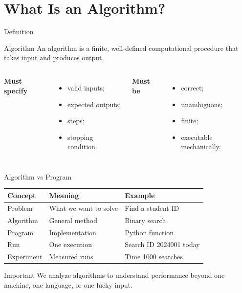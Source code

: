 \documentclass[aspectratio=169,xcolor=dvipsnames]{beamer}
\begin{document}
\section{What Is an Algorithm?}

\begin{frame}{Definition}
  \begin{block}{Algorithm}
    An algorithm is a finite, well-defined computational procedure that takes input and produces output.
  \end{block}
  \vspace{0.5em}
  \begin{columns}
    \textbf{Must specify}
    \begin{itemize}
      \item valid inputs;
      \item expected outputs;
      \item steps;
      \item stopping condition.
    \end{itemize}
    \textbf{Must be}
    \begin{itemize}
      \item correct;
      \item unambiguous;
      \item finite;
      \item executable mechanically.
    \end{itemize}
  \end{columns}
\end{frame}

\begin{frame}{Algorithm vs Program}
  \begin{table}
    \centering
    \begin{tabular}{lll}
      \toprule
      Concept & Meaning & Example \\
      \midrule
      Problem & What we want to solve & Find a student ID \\
      Algorithm & General method & Binary search \\
      Program & Implementation & Python function \\
      Run & One execution & Search ID 2024001 today \\
      Experiment & Measured runs & Time 1000 searches \\
      \bottomrule
    \end{tabular}
  \end{table}
  \vspace{0.5em}
  \begin{block}{Important}
    We analyze algorithms to understand performance beyond one machine, one language, or one lucky input.
  \end{block}
\end{frame}
\end{document}
